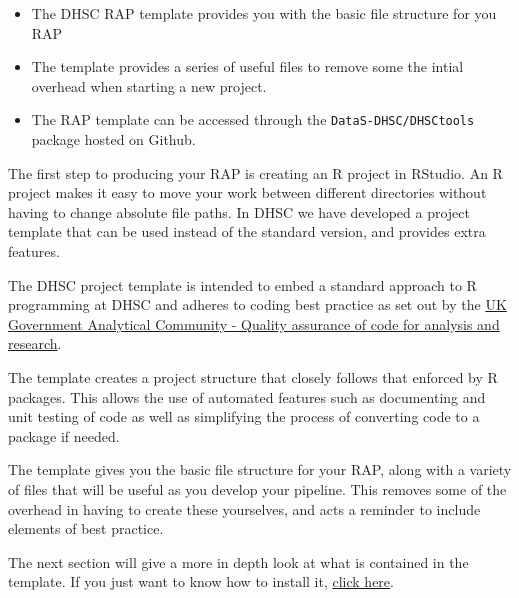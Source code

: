 \documentclass[
  letterpaper,
]{book}
\begin{document}
\begin{tcolorbox}[enhanced jigsaw, toprule=.15mm, left=2mm, colback=white, breakable, title=\textcolor{quarto-callout-note-color}{\faInfo}\hspace{0.5em}{Key Points}, colframe=quarto-callout-note-color-frame, opacitybacktitle=0.6, coltitle=black, titlerule=0mm, bottomrule=.15mm, rightrule=.15mm, bottomtitle=1mm, toptitle=1mm, arc=.35mm, leftrule=.75mm, opacityback=0, colbacktitle=quarto-callout-note-color!10!white]

\begin{itemize}
\item
  The DHSC RAP template provides you with the basic file structure for
  you RAP
\item
  The template provides a series of useful files to remove some the
  intial overhead when starting a new project.
\item
  The RAP template can be accessed through the
  \texttt{DataS-DHSC/DHSCtools} package hosted on Github.
\end{itemize}

\end{tcolorbox}

The first step to producing your RAP is creating an R project in
RStudio. An R project makes it easy to move your work between different
directories without having to change absolute file paths. In DHSC we
have developed a project template that can be used instead of the
standard version, and provides extra features.

The DHSC project template is intended to embed a standard approach to R
programming at DHSC and adheres to coding best practice as set out by
the
\href{https://best-practice-and-impact.github.io/qa-of-code-guidance/}{UK
Government Analytical Community - Quality assurance of code for analysis
and research}.

The template creates a project structure that closely follows that
enforced by R packages. This allows the use of automated features such
as documenting and unit testing of code as well as simplifying the
process of converting code to a package if needed.

The template gives you the basic file structure for your RAP, along with
a variety of files that will be useful as you develop your pipeline.
This removes some of the overhead in having to create these yourselves,
and acts a reminder to include elements of best practice.

The next section will give a more in depth look at what is contained in
the template. If you just want to know how to install it,
\protect\hyperlink{ux5cux23ux5cux2520Installingux5cux2520theux5cux2520DHSCtoolsux5cux2520package}{click
here}.
\end{document}
